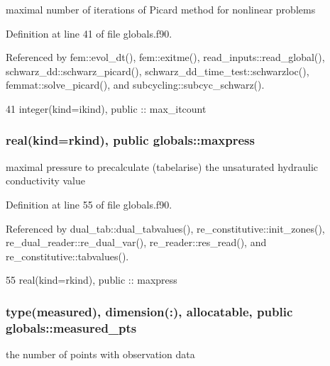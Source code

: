 maximal number of iterations of Picard method for nonlinear problems 



Definition at line 41 of file globals.\+f90.



Referenced by fem\+::evol\+\_\+dt(), fem\+::exitme(), read\+\_\+inputs\+::read\+\_\+global(), schwarz\+\_\+dd\+::schwarz\+\_\+picard(), schwarz\+\_\+dd\+\_\+time\+\_\+test\+::schwarzloc(), femmat\+::solve\+\_\+picard(), and subcycling\+::subcyc\+\_\+schwarz().


\begin{DoxyCode}
41   \textcolor{keywordtype}{integer(kind=ikind)}, \textcolor{keywordtype}{public} :: max_itcount
\end{DoxyCode}
\subsubsection[{maxpress}]{\setlength{\rightskip}{0pt plus 5cm}real(kind=rkind), public globals\+::maxpress}\label{namespaceglobals_af4312280ad8218c6bd8a99046af454aa}


maximal pressure to precalculate (tabelarise) the unsaturated hydraulic conductivity value 



Definition at line 55 of file globals.\+f90.



Referenced by dual\+\_\+tab\+::dual\+\_\+tabvalues(), re\+\_\+constitutive\+::init\+\_\+zones(), re\+\_\+dual\+\_\+reader\+::re\+\_\+dual\+\_\+var(), re\+\_\+reader\+::res\+\_\+read(), and re\+\_\+constitutive\+::tabvalues().


\begin{DoxyCode}
55   \textcolor{keywordtype}{real(kind=rkind)}, \textcolor{keywordtype}{public} :: maxpress
\end{DoxyCode}
\subsubsection[{measured\+\_\+pts}]{\setlength{\rightskip}{0pt plus 5cm}type({\bf measured}), dimension(\+:), allocatable, public globals\+::measured\+\_\+pts}\label{namespaceglobals_ac2391ac68800c102dcd71b053b7f47e6}


the number of points with observation data 



